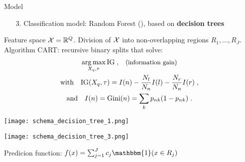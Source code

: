 \begin{frame}{Model}{}
\begin{minipage}[t]{0.49\linewidth}
    \vspace{3cm}
    \pause[2]
    \begin{enumerate}
        \item[3.] Classification model: Random Forest (\citet{Breiman2001}), based on \textbf{decision trees}
        
    \end{enumerate}
\end{minipage}\hfill
\begin{minipage}[t]{0.49\linewidth}
    \vspace{0pt}
    \begin{tcolorbox}[title=Decision tree,size=title,boxrule=0.2pt]
    \small
    Feature space $\mathcal{X} = \mathbb{R}^Q$.
    Division of $\mathcal{X}$ into non-overlapping regions $R_1,...,R_J$.
    Algorithm CART: recursive binary splits \cite{breiman84} that solve:
    \begin{gather*}
        \operatorname*{arg\,max}_{X_{q}, \tau} \mathrm{IG}\;,  \;\;\;\text{\small{(information gain)}}\\
        \text{with} \quad \mathrm{IG}(X_{q}, \tau) = I(n) - \frac{N_{l}}{N_n}I(l) - \frac{N_{r}}{N_{n}}I(r)\;,\\
        \text{and} \quad I(n) = \mathrm{Gini}(n) = \sum_{k}p_{nk}(1-p_{nk})\;.
    \end{gather*}
    \end{tcolorbox}
    \begin{minipage}[t]{0.49\linewidth}
        \vspace{-5pt}
        \centering
        \texttt{[image: schema\_decision\_tree\_1.png]}\\
    \end{minipage}
    \begin{minipage}[t]{0.49\linewidth}
        \vspace{-5pt}
        \centering
        \texttt{[image: schema\_decision\_tree\_3.png]}\\
    \end{minipage}
    \centering
    \small
    Predicion function:\;
    $f(x) = \sum_{j=1}^{J}c_{j}\mathbbm{1}(x\in R_{j})$

\end{minipage}
\end{frame}

